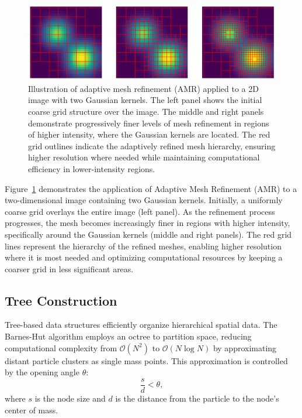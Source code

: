\begin{figure}
    \centering
    \includegraphics[width=\textwidth]{figures/adaptive_mesh_refinement.png}
    \caption{Illustration of adaptive mesh refinement (AMR) applied to a 2D image with two Gaussian kernels. The left panel shows the initial coarse grid structure over the image. The middle and right panels demonstrate progressively finer levels of mesh refinement in regions of higher intensity, where the Gaussian kernels are located. The red grid outlines indicate the adaptively refined mesh hierarchy, ensuring higher resolution where needed while maintaining computational efficiency in lower-intensity regions.}
    \label{fig:amr}
\end{figure}
Figure~\ref{fig:amr} demonstrates the application of Adaptive Mesh Refinement (AMR) to a two-dimensional image containing two Gaussian kernels. Initially, a uniformly coarse grid overlays the entire image (left panel). As the refinement process progresses, the mesh becomes increasingly finer in regions with higher intensity, specifically around the Gaussian kernels (middle and right panels). The red grid lines represent the hierarchy of the refined meshes, enabling higher resolution where it is most needed and optimizing computational resources by keeping a coarser grid in less significant areas.

\subsection{Tree Construction}
Tree-based data structures efficiently organize hierarchical spatial data. The Barnes-Hut algorithm employs an octree to partition space, reducing computational complexity from $\mathcal{O}(N^2)$ to $\mathcal{O}(N \log N)$ by approximating distant particle clusters as single mass points. This approximation is controlled by the opening angle $\theta$:
\begin{equation}
    \frac{s}{d} < \theta,
\end{equation}
where $s$ is the node size and $d$ is the distance from the particle to the node's center of mass.

